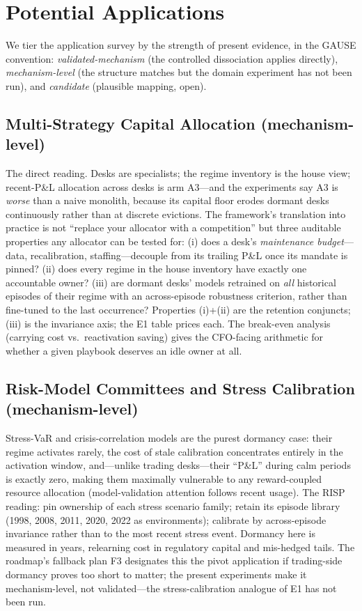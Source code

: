 \documentclass[10pt]{article}
\newcommand{\nm}{\textsc{RISP}}
\begin{document}
\section{Potential Applications}
\label{sec:applications}

We tier the application survey by the strength of present evidence, in
the GAUSE convention: \emph{validated-mechanism} (the controlled
dissociation applies directly), \emph{mechanism-level} (the structure
matches but the domain experiment has not been run), and
\emph{candidate} (plausible mapping, open).

\subsection{Multi-Strategy Capital Allocation (mechanism-level)}

The direct reading. Desks are specialists; the regime inventory is the
house view; recent-P\&L allocation across desks is arm A3---and the
experiments say A3 is \emph{worse} than a naive monolith, because its
capital floor erodes dormant desks continuously rather than at discrete
evictions. The framework's translation into practice is not ``replace
your allocator with a competition'' but three auditable properties any
allocator can be tested for: (i) does a desk's \emph{maintenance
budget}---data, recalibration, staffing---decouple from its trailing
P\&L once its mandate is pinned? (ii) does every regime in the house
inventory have exactly one accountable owner? (iii) are dormant desks'
models retrained on \emph{all} historical episodes of their regime with
an across-episode robustness criterion, rather than fine-tuned to the
last occurrence? Properties (i)+(ii) are the retention conjuncts;
(iii) is the invariance axis; the E1 table prices each. The break-even
analysis (carrying cost vs.\ reactivation saving) gives the CFO-facing
arithmetic for whether a given playbook deserves an idle owner at all.

\subsection{Risk-Model Committees and Stress Calibration
(mechanism-level)}

Stress-VaR and crisis-correlation models are the purest dormancy case:
their regime activates rarely, the cost of stale calibration concentrates
entirely in the activation window, and---unlike trading desks---their
``P\&L'' during calm periods is exactly zero, making them maximally
vulnerable to any reward-coupled resource allocation (model-validation
attention follows recent usage). The \nm{} reading: pin ownership of each
stress scenario family; retain its episode library (1998, 2008, 2011,
2020, 2022 as environments); calibrate by across-episode invariance
rather than to the most recent stress event. Dormancy here is measured in
years, relearning cost in regulatory capital and mis-hedged tails. The
roadmap's fallback plan F3 designates this the pivot application if
trading-side dormancy proves too short to matter; the present experiments
make it mechanism-level, not validated---the stress-calibration analogue
of E1 has not been run.
\end{document}
